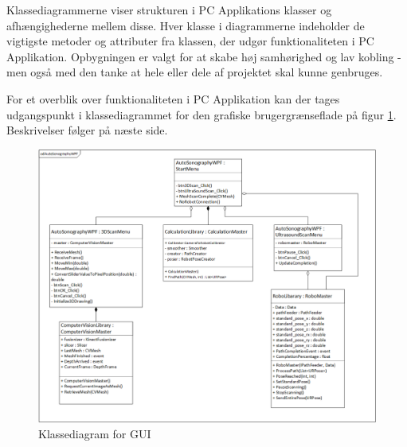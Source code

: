 Klassediagrammerne viser strukturen i PC Applikations klasser og afhængighederne mellem disse. Hver klasse i diagrammerne indeholder de vigtigste metoder og attributer fra klassen, der udgør funktionaliteten i PC Applikation. Opbygningen er valgt for at skabe høj samhørighed og lav kobling - men også med den tanke at hele eller dele af projektet skal kunne genbruges.

For et overblik over funktionaliteten i PC Applikation kan der tages udgangspunkt i klassediagrammet for den grafiske brugergrænseflade på figur \ref{class_gui}. Beskrivelser følger på næste side. 

\begin{figure}[H]
    \centering
    \includegraphics[width=1\textwidth]{figurer/d/Design/Class/uml_class_gui}
    \caption{Klassediagram for GUI}
    \label{class_gui}
\end{figure}
\newpage

